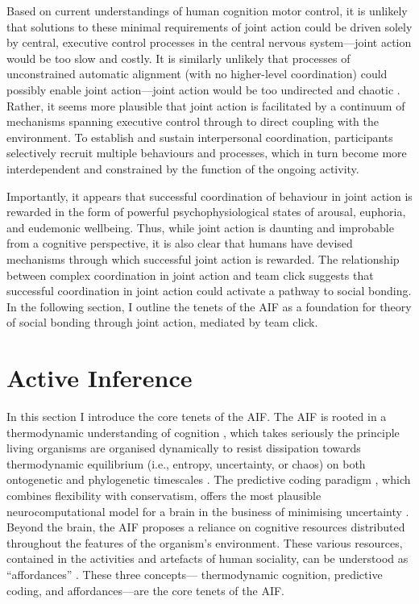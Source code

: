 \begin{CJK}{UTF8}{gbsn}
Based on current understandings of human cognition motor control, it is unlikely that solutions to these minimal requirements of joint action could be driven solely by central, executive control processes in the central nervous system---joint action would be too slow and costly.  It is similarly unlikely that processes of unconstrained automatic alignment (with no higher-level coordination) could possibly enable joint action---joint action would be too undirected and chaotic \citep{Fusaroli2014}.  Rather, it seems more plausible that joint action is facilitated by a continuum of mechanisms spanning executive control through to direct coupling with the environment.  To establish and sustain interpersonal coordination, participants selectively recruit multiple behaviours and processes, which in turn become more interdependent and constrained by the function of the ongoing activity.

Importantly, it appears that successful coordination of behaviour in joint action is rewarded in the form of powerful psychophysiological states of arousal, euphoria, and eudemonic wellbeing.  Thus, while joint action is daunting and improbable from a cognitive perspective, it is also clear that humans have devised mechanisms through which successful joint action is rewarded. The relationship between complex coordination in joint action and team click suggests that successful coordination in joint action could activate a pathway to social bonding.  In the following section, I outline the tenets of the AIF as a foundation for theory of social bonding through joint action, mediated by team click.





\section{Active Inference \label{sect:activeIn}}

In this section I introduce the core tenets of the AIF.  The  AIF is rooted in a thermodynamic understanding of cognition \citep{Yufik2017}, which takes seriously the principle living organisms are organised dynamically to resist dissipation towards thermodynamic equilibrium (i.e., entropy, uncertainty, or chaos) on both ontogenetic and phylogenetic timescales \citep[see   see][]{Friston2010,Yufik2002,Sengupta2016,Linson2018}.  The predictive coding paradigm \citep[cf.][]{Rao1999,Clark2013}, which combines flexibility with conservatism, offers the most plausible neurocomputational model for a brain in the business of minimising uncertainty \citep{Friston2006}.  Beyond the brain, the AIF proposes a reliance on cognitive resources distributed throughout the features of the organism's environment. These various resources, contained in the activities and artefacts of human sociality, can be understood as ``affordances'' \citep{Gibson1979,Ramstead2016}. These three concepts--- thermodynamic cognition, predictive coding, and affordances---are the core tenets of the AIF.


\end{CJK}
